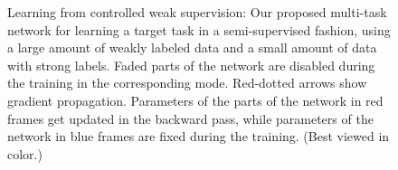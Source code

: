 \begin{figure}[!t]%
    \caption{Learning from controlled weak supervision: Our proposed multi-task network for learning a target task in a semi-supervised fashion, using a large amount of weakly labeled data and a small amount of data with strong labels.
    Faded parts of the network are disabled during the training in the corresponding mode. Red-dotted arrows show gradient propagation. Parameters of the parts of the network in red frames get updated in the backward pass, while parameters of the network in blue frames are fixed during the training. (Best viewed in color.)}
    \label{fig:model_cws}
\end{figure}

